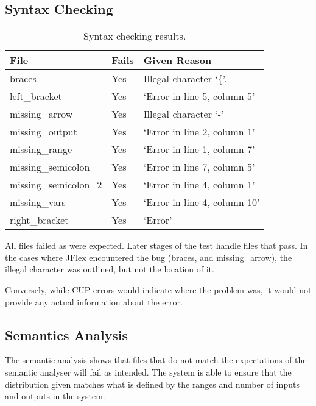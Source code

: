 \documentclass[report.tex]{subfiles}
\begin{document}
\subsection{Syntax Checking} %
\label{sub:syntax_checking_res}
\begin{table}[H]
    \centering
    \begin{tabular}{l | l | l}
    File & Fails & Given Reason \\
    \hline
    braces & Yes & Illegal character `\{'. \\
    left\_bracket & Yes & `Error in line 5, column 5' \\
    missing\_arrow & Yes & Illegal character `-' \\
    missing\_output & Yes & `Error in line 2, column 1' \\
    missing\_range & Yes & `Error in line 1, column 7' \\
    missing\_semicolon & Yes & `Error in line 7, column 5' \\
    missing\_semicolon\_2 & Yes & `Error in line 4, column 1' \\
    missing\_vars & Yes & `Error in line 4, column 10' \\
    right\_bracket & Yes & `Error' \\
    \hline
    \end{tabular}
    \caption{Syntax checking results.}
    \label{tab:syntax_result}
\end{table}

All files failed as were expected. Later stages of the test handle files that
pass. In the cases where JFlex encountered the bug (braces, and missing\_arrow),
the illegal character was outlined, but not the location of it.

Conversely, while CUP errors would indicate where the problem was, it would not
provide any actual information about the error.

\subsection{Semantics Analysis} %
\label{sub:semantics_analysis}
The semantic analysis shows that files that do not match the expectations of the
semantic analyser will fail as intended. The system is able to ensure that
the distribution given matches what is defined by the ranges and number of
inputs and outputs in the system.
\end{document}
